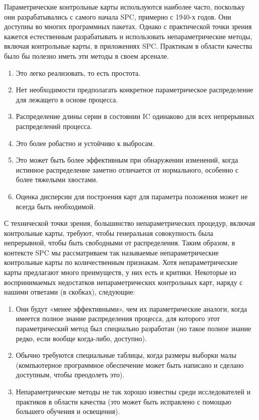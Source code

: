 Параметрические контрольные карты используются наиболее часто, поскольку они разрабатывались с самого начала SPC, примерно с 1940-х годов. Они доступны во многих программных пакетах. Однако с практической точки зрения кажется естественным разрабатывать и использовать непараметрические методы, включая контрольные карты, в приложениях SPC. Практикам в области качества было бы полезно иметь эти методы в своем арсенале.

\begin{enumerate}
	\item Это легко реализовать, то есть простота.
	\item Нет необходимости предполагать конкретное параметрическое распределение для лежащего в основе процесса.
	\item Распределение длины серии в состоянии IC одинаково для всех непрерывных распределений процесса.
	\item Это более робастно и устойчиво к выбросам.
	\item Это может быть более эффективным при обнаружении изменений, когда истинное распределение заметно отличается от нормального, особенно с более тяжелыми хвостами.
	\item Оценка дисперсии для построения карт для параметра положения может не всегда быть необходимой.
\end{enumerate}

С технической точки зрения, большинство непараметрических процедур, включая контрольные карты, требуют, чтобы генеральная совокупность была непрерывной, чтобы быть свободными от распределения. Таким образом, в контексте SPC мы рассматриваем так называемые непараметрические контрольные карты по количественным признакам. Хотя непараметрические карты предлагают много преимуществ, у них есть и критики. Некоторые из воспринимаемых недостатков непараметрических контрольных карт, наряду с нашими ответами (в скобках), следующие:

\begin{enumerate}
	\item Они будут «менее эффективными», чем их параметрические аналоги, когда имеется полное знание распределения процесса, для которого этот параметрический метод был специально разработан (но такое полное знание редко, если вообще когда-либо, доступно).
	\item Обычно требуются специальные таблицы, когда размеры выборки малы (компьютерное программное обеспечение может быть написано и сделано доступным, чтобы преодолеть это).
	\item Непараметрические методы не так хорошо известны среди исследователей и практиков в области качества (это может быть исправлено с помощью большего обучения и освещения).
\end{enumerate}

